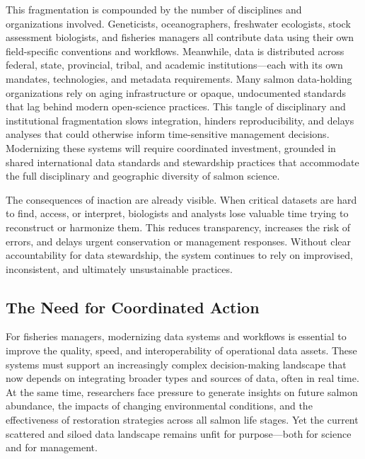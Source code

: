 \documentclass[
  letterpaper,
  DIV=11,
  numbers=noendperiod]{scrartcl}
\begin{document}
This fragmentation is compounded by the number of disciplines and
organizations involved. Geneticists, oceanographers, freshwater
ecologists, stock assessment biologists, and fisheries managers all
contribute data using their own field-specific conventions and
workflows. Meanwhile, data is distributed across federal, state,
provincial, tribal, and academic institutions---each with its own
mandates, technologies, and metadata requirements. Many salmon
data-holding organizations rely on aging infrastructure or opaque,
undocumented standards that lag behind modern open-science practices.
This tangle of disciplinary and institutional fragmentation slows
integration, hinders reproducibility, and delays analyses that could
otherwise inform time-sensitive management decisions. Modernizing these
systems will require coordinated investment, grounded in shared
international data standards and stewardship practices that accommodate
the full disciplinary and geographic diversity of salmon science.

The consequences of inaction are already visible. When critical datasets
are hard to find, access, or interpret, biologists and analysts lose
valuable time trying to reconstruct or harmonize them. This reduces
transparency, increases the risk of errors, and delays urgent
conservation or management responses. Without clear accountability for
data stewardship, the system continues to rely on improvised,
inconsistent, and ultimately unsustainable practices.

\subsection{The Need for Coordinated
Action}\label{the-need-for-coordinated-action}

For fisheries managers, modernizing data systems and workflows is
essential to improve the quality, speed, and interoperability of
operational data assets. These systems must support an increasingly
complex decision-making landscape that now depends on integrating
broader types and sources of data, often in real time. At the same time,
researchers face pressure to generate insights on future salmon
abundance, the impacts of changing environmental conditions, and the
effectiveness of restoration strategies across all salmon life stages.
Yet the current scattered and siloed data landscape remains unfit for
purpose---both for science and for management.
\end{document}
